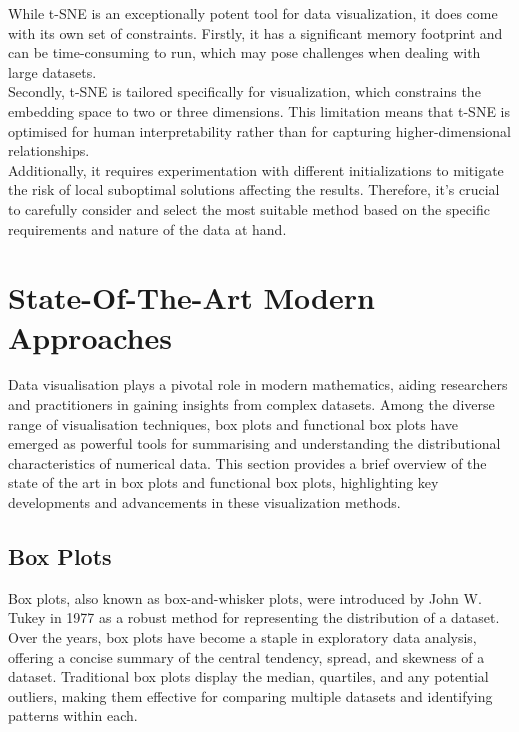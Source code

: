 \documentclass{article}\usepackage[]{graphicx}\usepackage[]{xcolor}
\numberwithin{equation}{section}
\begin{document}
{\noindent
While t-SNE is an exceptionally potent tool for data visualization, it does come with its own set of constraints. Firstly, it has a significant memory footprint and can be time-consuming to run, which may pose challenges when dealing with large datasets.\\

\noindent
Secondly, t-SNE is tailored specifically for visualization, which constrains the embedding space to two or three dimensions. This limitation means that t-SNE is optimised for human interpretability rather than for capturing higher-dimensional relationships.\\

\noindent
Additionally, it requires experimentation with different initializations to mitigate the risk of local suboptimal solutions affecting the results. Therefore, it's crucial to carefully consider and select the most suitable method based on the specific requirements and nature of the data at hand.\\

\newpage 

\section{State-Of-The-Art Modern Approaches}
Data visualisation plays a pivotal role in modern mathematics, aiding researchers and practitioners in gaining insights from complex datasets. Among the diverse range of visualisation techniques, box plots and functional box plots have emerged as powerful tools for summarising and understanding the distributional characteristics of numerical data. This section provides a brief overview of the state of the art in box plots and functional box plots, highlighting key developments and advancements in these visualization methods.

\subsection{Box Plots}

\noindent Box plots, also known as box-and-whisker plots, were introduced by John W. Tukey in 1977 as a robust method for representing the distribution of a dataset. Over the years, box plots have become a staple in exploratory data analysis, offering a concise summary of the central tendency, spread, and skewness of a dataset. Traditional box plots display the median, quartiles, and any potential outliers, making them effective for comparing multiple datasets and identifying patterns within each.\\

}
\end{document}
